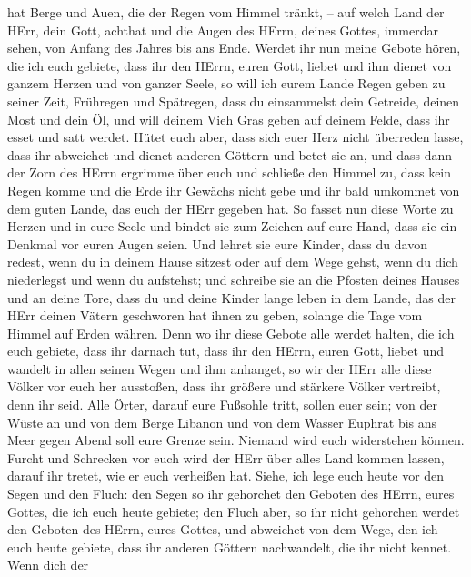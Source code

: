 hat Berge und Auen, die der Regen vom Himmel tränkt, -- 
auf welch Land der HErr, dein Gott, achthat und die Augen des HErrn,
deines Gottes, immerdar sehen, von Anfang des Jahres bis ans Ende.
 Werdet ihr nun meine Gebote hören, die ich euch gebiete,
dass ihr den HErrn, euren Gott, liebet und ihm dienet von ganzem Herzen
und von ganzer Seele,  so will ich eurem Lande Regen geben
zu seiner Zeit, Frühregen und Spätregen, dass du einsammelst dein
Getreide, deinen Most und dein Öl,  und will deinem Vieh
Gras geben auf deinem Felde, dass ihr esset und satt werdet.
 Hütet euch aber, dass sich euer Herz nicht überreden
lasse, dass ihr abweichet und dienet anderen Göttern und betet sie an,
 und dass dann der Zorn des HErrn ergrimme über euch und
schließe den Himmel zu, dass kein Regen komme und die Erde ihr Gewächs
nicht gebe und ihr bald umkommet von dem guten Lande, das euch der HErr
gegeben hat.  So fasset nun diese Worte zu Herzen und in
eure Seele und bindet sie zum Zeichen auf eure Hand, dass sie ein
Denkmal vor euren Augen seien.  Und lehret sie eure Kinder,
dass du davon redest, wenn du in deinem Hause sitzest oder auf dem Wege
gehst, wenn du dich niederlegst und wenn du aufstehst;  und
schreibe sie an die Pfosten deines Hauses und an deine Tore,
 dass du und deine Kinder lange leben in dem Lande, das der
HErr deinen Vätern geschworen hat ihnen zu geben, solange die Tage vom
Himmel auf Erden währen.  Denn wo ihr diese Gebote alle
werdet halten, die ich euch gebiete, dass ihr darnach tut, dass ihr den
HErrn, euren Gott, liebet und wandelt in allen seinen Wegen und ihm
anhanget,  so wir der HErr alle diese Völker vor euch her
ausstoßen, dass ihr größere und stärkere Völker vertreibt, denn ihr
seid.  Alle Örter, darauf eure Fußsohle tritt, sollen euer
sein; von der Wüste an und von dem Berge Libanon und von dem Wasser
Euphrat bis ans Meer gegen Abend soll eure Grenze sein. 
Niemand wird euch widerstehen können. Furcht und Schrecken vor euch wird
der HErr über alles Land kommen lassen, darauf ihr tretet, wie er euch
verheißen hat.  Siehe, ich lege euch heute vor den Segen
und den Fluch:  den Segen so ihr gehorchet den Geboten des
HErrn, eures Gottes, die ich euch heute gebiete;  den Fluch
aber, so ihr nicht gehorchen werdet den Geboten des HErrn, eures Gottes,
und abweichet von dem Wege, den ich euch heute gebiete, dass ihr anderen
Göttern nachwandelt, die ihr nicht kennet.  Wenn dich der
